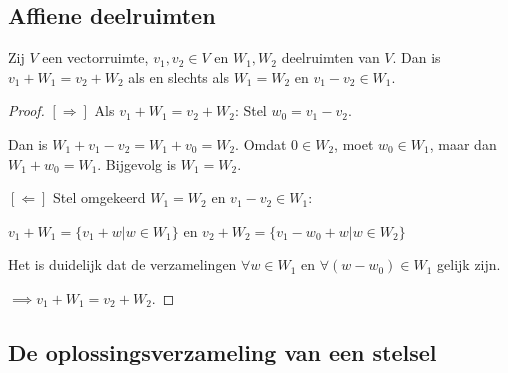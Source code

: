 \subsection{Affiene deelruimten}

\begin{lemma}[5.2.4]
    Zij $V$ een vectorruimte, $v_1, v_2 \in V$ en $W_1, W_2$ deelruimten van $V$. Dan is $v_1 + W_1 = v_2 + W_2$ als en slechts als $W_1 = W_2$ en $v_1 - v_2 \in W_1$.
\end{lemma}
\begin{proof}
    \([\Rightarrow]\) Als \(v_1 + W_1 = v_2 + W_2\): Stel \(w_0 = v_1 -v_2\).

    Dan is \(W_1 + v_1-v_2= W_1 + v_0 = W_2\). Omdat \(0 \in W_2\), moet \(w_0 \in W_1\), maar dan \(W_1 + w_0 = W_1\).
    Bijgevolg is \(W_1 = W_2\).

    \([\Leftarrow]\) Stel omgekeerd $W_1 = W_2$ en $v_1 - v_2 \in W_1$:

    \(v_1 + W_1 = \{v_1 + w | w\in W_1\}\) en \(v_2 + W_2 = \{v_1 - w_0 + w | w\in W_2\}\)

    Het is duidelijk dat de verzamelingen \(\forall w \in W_1 \text{ en } \forall (w-w_0) \in W_1\) gelijk zijn.

    \(\implies v_1 + W_1 = v_2 + W_2\).
\end{proof}

\subsection{De oplossingsverzameling van een stelsel}


